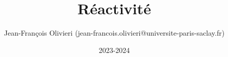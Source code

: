 \documentclass[a4paper]{article}
\title{Réactivité}
\author{Jean-François Olivieri (jean-francois.olivieri@universite-paris-saclay.fr)}
\date{2023-2024}
\theoremstyle{definition}
\begin{document}

\graphicspath{{Allo-CP-Ex02/}}


\newpage

\graphicspath{{Allo-CP-Ex03/}}


\newpage

\graphicspath{{Allo-CP-Ex04/}}


\newpage

\graphicspath{{Diag-PT-Ex01/}}


\newpage

\graphicspath{{Diag-PT-Ex02/}}


\newpage

\graphicspath{{Gaz-CP-Ex01/}}


\newpage

\graphicspath{{Gaz-CP-Ex02/}}


\newpage

\graphicspath{{Gaz-CP-Ex03/}}


\newpage

\graphicspath{{Poly-CP-Ex01/}}


\newpage

\graphicspath{{Poly-CP-Ex02/}}


\newpage

\graphicspath{{Trans-CP-Ex01/}}


\newpage

\graphicspath{{Trans-CP-Ex02/}}


\newpage

\graphicspath{{Trans-CP-Ex03/}}


\newpage
\end{document}
